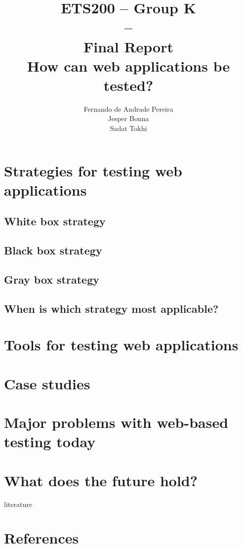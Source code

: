 \documentclass[a4paper]{article}
\title{ETS200 -- Group K\\--\\ Final Report \\
How can web applications be tested?
}
\author{Fernando de Andrade Pereira
\\Jesper Bonna
\\Sadat Tokhi
}
\begin{document}
\maketitle
\thispagestyle{empty}
\clearpage

\tableofcontents
\thispagestyle{empty}
\clearpage

\setcounter{page}{1}

\section{Strategies for testing web applications}

\subsection{White box strategy}

\subsection{Black box strategy}

\subsection{Gray box strategy}

\subsection{When is which strategy most applicable?}

\section{Tools for testing web applications}

\section{Case studies}

\section{Major problems with web-based testing today}

\section{What does the future hold?}

\newpage
\appendix

\begin{btSect}[alpha]{literature}
\section{References}
\btPrintAll
\end{btSect}
\end{document}
